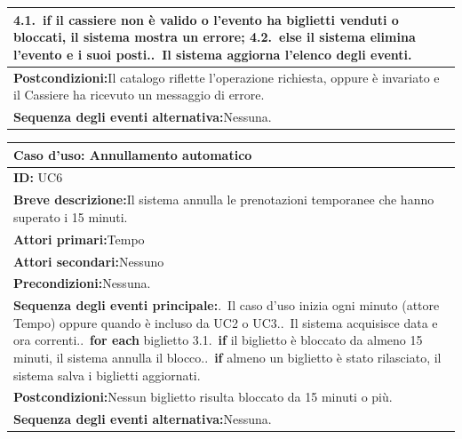 \begin{center}
\begin{tabular}{|p{}|}
\hspace*{1em}4.1.~\textbf{if} il cassiere non è valido o l'evento ha biglietti venduti o bloccati, il sistema mostra un errore;\newline
\hspace*{1em}4.2.~\textbf{else} il sistema elimina l'evento e i suoi posti.\newline
5.~Il sistema aggiorna l'elenco degli eventi. \\ \hline
\textbf{Postcondizioni:}\newline Il catalogo riflette l'operazione richiesta, oppure è invariato e il Cassiere ha ricevuto un messaggio di errore. \\ \hline
\textbf{Sequenza degli eventi alternativa:}\newline Nessuna. \\ \hline
\end{tabular}
\end{center}

\begin{center}
\small
\begin{tabular}{|p{}|}
\hline
\textbf{Caso d'uso: Annullamento automatico} \\ \hline
\textbf{ID:} UC6 \\ \hline
\textbf{Breve descrizione:}\newline Il sistema annulla le prenotazioni temporanee che hanno superato i 15 minuti. \\ \hline
\textbf{Attori primari:}\newline Tempo \\ \hline
\textbf{Attori secondari:}\newline Nessuno \\ \hline
\textbf{Precondizioni:}\newline Nessuna. \\ \hline
\textbf{Sequenza degli eventi principale:}\newline 1.~Il caso d'uso inizia ogni minuto (attore Tempo) oppure quando è incluso da UC2 o UC3.\newline
2.~Il sistema acquisisce data e ora correnti.\newline
3.~\textbf{for each} biglietto\newline
\hspace*{1em}3.1.~\textbf{if} il biglietto è bloccato da almeno 15 minuti, il sistema annulla il blocco.\newline
4.~\textbf{if} almeno un biglietto è stato rilasciato, il sistema salva i biglietti aggiornati. \\ \hline
\textbf{Postcondizioni:}\newline Nessun biglietto risulta bloccato da 15 minuti o più. \\ \hline
\textbf{Sequenza degli eventi alternativa:}\newline Nessuna. \\ \hline
\end{tabular}
\end{center}

